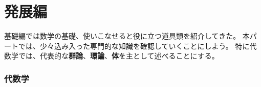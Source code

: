 \documentclass[a4j, 9pt]{ltjsarticle}
\begin{document}
\newpage

\part{発展編}
  基礎編では数学の基礎、使いこなせると役に立つ道具類を紹介してきた。
  本パートでは、少々込み入った専門的な知識を確認していくことにしよう。
  特に代数学では、代表的な\textbf{群論}、\textbf{環論}、\textbf{体}を主として述べることにする。

  \section{代数学}
    
\end{document}
